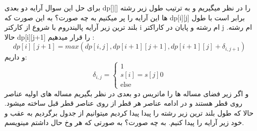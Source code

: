 \problem{}
برای حل این سوال آرایه دو بعدی dp[][] را در نظر میگیریم
و به ترتیب طول زیر رشته ها این آرایه را پر میکنیم به چه صورت؟
به این صورت که dp[i][j]
 برابر است با طول بلند ترین زیر آرایه پالیندروم 
 با شروع از کارکتر i ام رشته و پایان در کاراکتر j ام رشته.
حالا dp[i][j+1] را قرار میدهیم :\\
\[
    dp[i][j+1] = max(dp[i,j],dp[i+1][j+1],dp[i+1][j]+\delta_{i,j+1})    
\]
و داریم:\\
\[
    \delta_{i,j}=
    \begin{cases}
        1\\ s[i]=s[j]
        0\\\text{else}
    \end{cases}
\]
و اگر زیر فضای مساله ها را ماتریس دو بعدی در نظر بگیریم مساله های اولیه عناصر روی قطر هستند
و در ادامه عناصر هر قطر از روی عناصر قطر قبل ساخته میشود.
حالا که طول بلند ترین زیر رشته را پیدا پیدا کردیم میتوانیم از جدول برگردیم به عقب و خود زیر آرایه
را پیدا کنیم.
به چه صورت؟
به صورتی که هر وخ حال داشتم مینویسم.